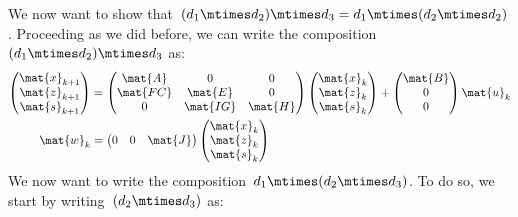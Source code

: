 We now want to show that~$(d_1\mtimes d_2)\mtimes d_3=d_1\mtimes (d_2\mtimes d_2)$.
Proceeding as we did before, we can write the composition~$(d_1\mtimes d_2)\mtimes d_3$ as:
\begin{equation*}
    \label{eq:dlin-5}
    \begin{aligned}
        \begin{pmatrix}
            \mat{x}_{k+1} \\
            \mat{z}_{k+1} \\
            \mat{s}_{k+1}
        \end{pmatrix}&=
        \begin{pmatrix}
            \mat{A}  & 0        & 0       \\
            \mat{FC} & \mat{E}  & 0       \\
            0        & \mat{IG} & \mat{H}
        \end{pmatrix}\begin{pmatrix}
                         \mat{x}_k\\ \mat{z}_k\\ \mat{s}_k
        \end{pmatrix}+
        \begin{pmatrix}
            \mat{B}\\ 0\\ 0
        \end{pmatrix}\mat{u}_k\\
        \mat{w}_k&=\begin{pmatrix}
                       0& 0& \mat{J}
        \end{pmatrix}\begin{pmatrix}
                         \mat{x}_k\\ \mat{z}_k\\ \mat{s}_k
        \end{pmatrix}
    \end{aligned}
\end{equation*}
We now want to write the composition~$d_1\mtimes (d_2\mtimes d_3)$.
To do so, we start by writing~$(d_2\mtimes d_3)$ as:
